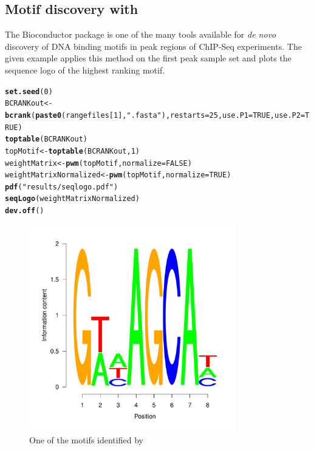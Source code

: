 \documentclass{article}\usepackage[]{graphicx}\usepackage[]{color}
\makeatletter
\newcommand{\hlnum}[1]{\textcolor[rgb]{0.686,0.059,0.569}{#1}}%
\newcommand{\hlstr}[1]{\textcolor[rgb]{0.192,0.494,0.8}{#1}}%
\newcommand{\hlstd}[1]{\textcolor[rgb]{0.345,0.345,0.345}{#1}}%
\newcommand{\hlkwb}[1]{\textcolor[rgb]{0.69,0.353,0.396}{#1}}%
\newcommand{\hlkwc}[1]{\textcolor[rgb]{0.333,0.667,0.333}{#1}}%
\newcommand{\hlkwd}[1]{\textcolor[rgb]{0.737,0.353,0.396}{\textbf{#1}}}%
\newenvironment{kframe}{%
 \def\at@end@of@kframe{}%
 \ifinner\ifhmode%
  \def\at@end@of@kframe{\end{minipage}}%
  \begin{minipage}{\columnwidth}%
 \fi\fi%
 \def\FrameCommand##1{\hskip\@totalleftmargin \hskip-\fboxsep
 \colorbox{shadecolor}{##1}\hskip-\fboxsep
     \hskip-\linewidth \hskip-\@totalleftmargin \hskip\columnwidth}%
 \MakeFramed {\advance\hsize-\width
   \@totalleftmargin\z@ \linewidth\hsize
   \@setminipage}}%
 {\par\unskip\endMakeFramed%
 \at@end@of@kframe}
\newenvironment{knitrout}{}{} %
\makeatother
\begin{document}
\subsection{Motif discovery with }
The Bioconductor package  is one of the many tools available for \textit{de novo} discovery of DNA binding motifs in peak regions of ChIP-Seq experiments. The given example applies this method on the first peak sample set and plots the sequence logo of the highest ranking motif.

\begin{knitrout}
\color{fgcolor}\begin{kframe}
\begin{alltt}
\hlkwd{set.seed}\hlstd{(}\hlnum{0}\hlstd{)}
\hlstd{BCRANKout} \hlkwb{<-} \hlkwd{bcrank}\hlstd{(}\hlkwd{paste0}\hlstd{(rangefiles[}\hlnum{1}\hlstd{],} \hlstr{".fasta"}\hlstd{),} \hlkwc{restarts}\hlstd{=}\hlnum{25}\hlstd{,} \hlkwc{use.P1}\hlstd{=}\hlnum{TRUE}\hlstd{,} \hlkwc{use.P2}\hlstd{=}\hlnum{TRUE}\hlstd{)}
\hlkwd{toptable}\hlstd{(BCRANKout)}
\hlstd{topMotif} \hlkwb{<-} \hlkwd{toptable}\hlstd{(BCRANKout,} \hlnum{1}\hlstd{)}
\hlstd{weightMatrix} \hlkwb{<-} \hlkwd{pwm}\hlstd{(topMotif,} \hlkwc{normalize} \hlstd{=} \hlnum{FALSE}\hlstd{)}
\hlstd{weightMatrixNormalized} \hlkwb{<-} \hlkwd{pwm}\hlstd{(topMotif,} \hlkwc{normalize} \hlstd{=} \hlnum{TRUE}\hlstd{)}
\hlkwd{pdf}\hlstd{(}\hlstr{"results/seqlogo.pdf"}\hlstd{)}
\hlkwd{seqLogo}\hlstd{(weightMatrixNormalized)}
\hlkwd{dev.off}\hlstd{()}
\end{alltt}
\end{kframe}
\end{knitrout}
\begin{figure}[H]
  \centering
   \includegraphics[width=9cm]{seqlogo.pdf}
   \caption{One of the motifs identified by }
   \label{fig:seqlogo}
\end{figure}
\end{document}
